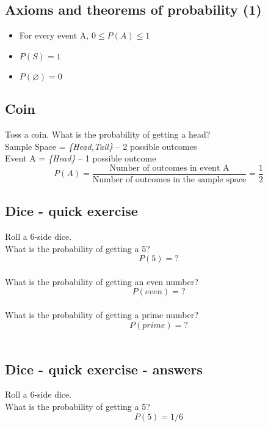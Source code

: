 \documentclass[11pt]{article}
\let\emptyset\varnothing
\begin{document}
	\subsection*{Axioms and theorems of probability (1)}
	\begin{itemize}
		\item For every event A, $0 \leq P(A) \leq 1$
		\item $P(S) = 1$
		\item $P(\emptyset) = 0$
	\end{itemize}


	\subsection*{Coin}
	Toss a coin. What is the probability of getting a head?\\
	
	Sample Space = \emph{\{Head,Tail\}} -- 2 possible outcomes\\
	
	Event A = \emph{\{Head\}} -- 1 possible outcome\\
	
	\[P(A) = \frac{\text{Number of outcomes in event A}}
	{\text{Number of outcomes in the sample space}} = \frac{1}{2}\]


	\subsection*{Dice - quick exercise}
	Roll a 6-side dice.\\
	
	What is the probability of getting a 5?\\
	\[P(5) = ?	\]\\
	
	What is the probability of getting an even number?\\
	\[P(even) = ?	\]\\
	
	What is the probability of getting a prime number?\\
	\[P(prime) = ?	\]\\	


	\subsection*{Dice - quick exercise - answers}

	Roll a 6-side dice.\\
	
	What is the probability of getting a 5?\\
	\[P(5) = 1/6	\]\\
	
\end{document}
